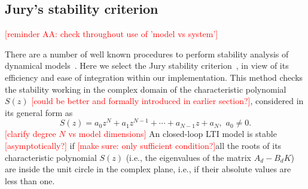 \documentclass[twocolumn]{autart}    %
\renewcommand{\note}[1]{\textcolor{red}{[#1]}}
\begin{document}
\subsection{Jury's stability criterion} 
\label{ssec:stabspecification}

\note{reminder AA: check throughout use of 'model vs system'}

There are a number of well known procedures to perform stability analysis of dynamical models~\cite{Astrom08}. 
Here we select the Jury stability criterion~\cite{astrom1997computer}, 
in view of its efficiency and ease of integration within our implementation.  
This method checks the stability working in the complex domain of the characteristic polynomial $S(z)$ \note{could be better and formally introduced in earlier section?},  
%
%
considered in its general form as 
%
\begin{equation*}
S(z) = a_0z^N+a_1z^{N-1}+\cdots+a_{N-1}z+a_N,\,\, a_0\neq0. 
\end{equation*}
\note{clarify degree $N$ vs model dimensions} 
An closed-loop LTI model is stable~\cite{astrom1997computer} \note{asymptotically?} if \note{make sure: only sufficient condition?}all the roots of its characteristic polynomial $S(z)$ (i.e., the 
eigenvalues of the matrix $A_d-B_dK$) are inside the unit circle in the complex plane, 
i.e., if their absolute values are less than one. 

\end{document}
